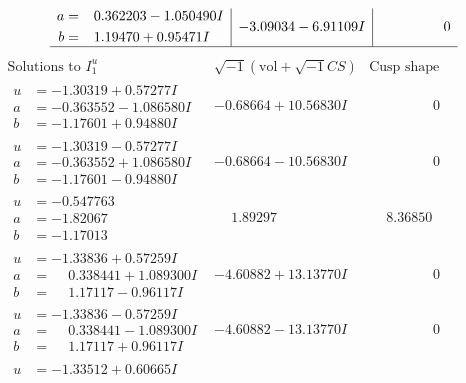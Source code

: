 \documentclass[1p]{elsarticle_modified}
\theoremstyle{definition}
\newcommand{\I}{\sqrt{-1}}
\begin{document}
$$\begin{array}{c|c|c}
\begin{aligned}
a &= \phantom{-}0.362203 - 1.050490 I \\
b &= \phantom{-}1.19470 + 0.95471 I\end{aligned}
 & -3.09034 - 6.91109 I & \phantom{-0.000000 } 0\\
 \hline 
 \end{array}$$\newpage$$\begin{array}{c|c|c}  
\text{Solutions to }I^u_{1}& \I (\text{vol} + \sqrt{-1}CS) & \text{Cusp shape}\\
 \hline 
\begin{aligned}
u &= -1.30319 + 0.57277 I \\
a &= -0.363552 - 1.086580 I \\
b &= -1.17601 + 0.94880 I\end{aligned}
 & -0.68664 + 10.56830 I & \phantom{-0.000000 } 0 \\ \hline\begin{aligned}
u &= -1.30319 - 0.57277 I \\
a &= -0.363552 + 1.086580 I \\
b &= -1.17601 - 0.94880 I\end{aligned}
 & -0.68664 - 10.56830 I & \phantom{-0.000000 } 0 \\ \hline\begin{aligned}
u &= -0.547763\phantom{ +0.000000I} \\
a &= -1.82067\phantom{ +0.000000I} \\
b &= -1.17013\phantom{ +0.000000I}\end{aligned}
 & \phantom{-}1.89297\phantom{ +0.000000I} & \phantom{-}8.36850\phantom{ +0.000000I} \\ \hline\begin{aligned}
u &= -1.33836 + 0.57259 I \\
a &= \phantom{-}0.338441 + 1.089300 I \\
b &= \phantom{-}1.17117 - 0.96117 I\end{aligned}
 & -4.60882 + 13.13770 I & \phantom{-0.000000 } 0 \\ \hline\begin{aligned}
u &= -1.33836 - 0.57259 I \\
a &= \phantom{-}0.338441 - 1.089300 I \\
b &= \phantom{-}1.17117 + 0.96117 I\end{aligned}
 & -4.60882 - 13.13770 I & \phantom{-0.000000 } 0 \\ \hline\begin{aligned}
u &= -1.33512 + 0.60665 I \\

\end{aligned}
\end{array}$$
\end{document}
